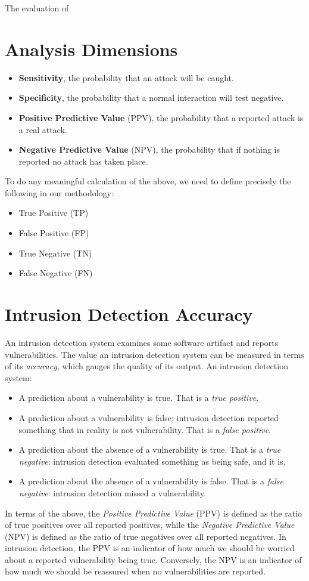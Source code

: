 \documentclass[conference]{IEEEtran}
\begin{document}
The evaluation of 

\section{Analysis Dimensions}

\begin{itemize}
\item {\bf Sensitivity}, the probability that an attack will be
  caught.
\item {\bf Specificity}, the probability that a normal interaction
  will test negative.
\item {\bf Positive Predictive Value} (PPV), the probability that a
  reported attack is a real attack.
\item {\bf Negative Predictive Value} (NPV), the probability that if
  nothing is reported no attack has taken place.
\end{itemize}

To do any meaningful calculation of the above, we need to define
precisely the following in our methodology:
\begin{itemize}
\item True Positive (TP)
\item False Positive (FP)
\item True Negative (TN)
\item False Negative (FN)
\end{itemize}

\section{Intrusion Detection Accuracy}

An intrusion detection system examines some software artifact and
reports vulnerabilities. The value an intrusion detection system can
be measured in terms of its \emph{accuracy}, which gauges the quality
of its output. An intrusion detection system:
\begin{itemize}
\item A prediction about a vulnerability is true. That is a \emph{true
    positive}. 
\item A prediction about a vulnerability is false; intrusion
  detection reported something that in reality is not vulnerability.
  That is a \emph{false positive}.
\item A prediction about the absence of a vulnerability is true. That
  is a \emph{true negative}: intrusion detection evaluated something
  as being safe, and it is.
\item A prediction about the absence of a vulnerability is false. That
  is a \emph{false negative}: intrusion detection missed a
  vulnerability.
\end{itemize}
In terms of the above, the \emph{Positive Predictive Value} (PPV) is
defined as the ratio of true positives over all reported positives,
while the \emph{Negative Predictive Value} (NPV) is defined as the
ratio of true negatives over all reported negatives. In intrusion
detection, the PPV is an indicator of how much we should be worried
about a reported vulnerability being true. Conversely, the NPV is an
indicator of how much we should be reassured when no vulnerabilities
are reported.
\end{document}
